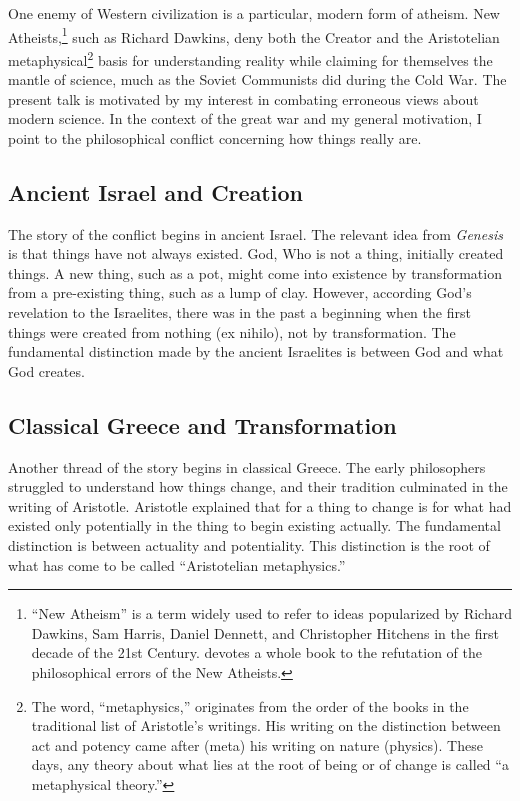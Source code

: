 \documentclass[twocolumn]{article}
\begin{document}
One enemy of Western civilization is a particular, modern form of atheism.  New
Atheists,\footnote{%
   ``New Atheism'' is a term widely used to refer to ideas popularized by
   Richard Dawkins, Sam Harris, Daniel Dennett, and Christopher Hitchens in the
   first decade of the 21st Century.  \cite{f2008} devotes a whole book to the
   refutation of the philosophical errors of the New Atheists.
}
such as Richard Dawkins, deny both the Creator and the Aristotelian
metaphysical\footnote{%
   The word, ``metaphysics,'' originates from the order of the books in the
   traditional list of Aristotle's writings.  His writing on the distinction
   between act and potency came after (meta) his writing on nature (physics).
   These days, any theory about what lies at the root of being or of change is
   called ``a metaphysical theory.''%
}
basis for understanding reality while claiming for themselves the mantle of
science, much as the Soviet Communists did during the Cold War.  The present
talk is motivated by my interest in combating erroneous views about modern
science.  In the context of the great war and my general motivation, I point to
the philosophical conflict concerning how things really are.

\subsection{Ancient Israel and Creation}

The story of the conflict begins in ancient Israel.  The relevant idea from
{\it Genesis} is that things have not always existed.  God, Who is not a thing,
initially created things.  A new thing, such as a pot, might come into
existence by transformation from a pre-existing thing, such as a lump of clay.
However, according God's revelation to the Israelites, there was in the past a
beginning when the first things were created from nothing (ex nihilo), not by
transformation.  The fundamental distinction made by the ancient Israelites is
between God and what God creates.

\subsection{Classical Greece and Transformation}

Another thread of the story begins in classical Greece.  The early philosophers
struggled to understand how things change, and their tradition culminated in
the writing of Aristotle.  Aristotle explained that for a thing to change is
for what had existed only potentially in the thing to begin existing actually.
The fundamental distinction is between actuality and potentiality.  This
distinction is the root of what has come to be called ``Aristotelian
metaphysics.''
\end{document}
